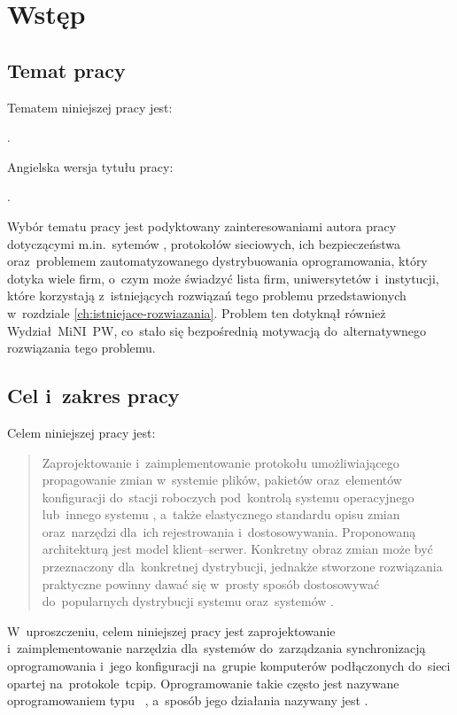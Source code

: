 \documentclass[thesis]{subfiles}
\makeatletter
\let\inserttitle\@title
\let\inserttitleaux\@titleaux
\makeatother
\begin{document}
\chapter{Wstęp}


\section{Temat pracy}

\noindent Tematem niniejszej pracy jest:
\begin{displayquote}
\inserttitle.
\end{displayquote}
Angielska wersja tytułu pracy:
\begin{displayquote}
\inserttitleaux.
\end{displayquote}
Wybór tematu pracy jest podyktowany zainteresowaniami autora pracy dotyczącymi m.in.~sytemów , protokołów sieciowych, ich bezpieczeństwa oraz~problemem zautomatyzowanego dystrybuowania oprogramowania, który dotyka wiele firm, o~czym może świadzyć lista firm, uniwersytetów i~instytucji, które korzystają z~istniejących rozwiązań tego problemu przedstawionych w~rozdziale \ref{ch:istniejace-rozwiazania}. Problem ten dotyknął również Wydział~MiNI~PW, co~stało się bezpośrednią motywacją do~alternatywnego rozwiązania tego problemu.


\section{Cel i~zakres pracy}
\label{sec:cel-i-zakres}

\noindent Celem niniejszej pracy jest:
\blockcquote{formularz-zgloszenia-pracy}{Zaprojektowanie i~zaimplementowanie protokołu umożliwiającego propagowanie zmian w~systemie plików, pakietów oraz~elementów konfiguracji do~stacji roboczych pod~kontrolą systemu operacyjnego  lub~innego systemu , a~także elastycznego standardu opisu zmian oraz~narzędzi dla~ich rejestrowania i~dostosowywania. Proponowaną architekturą jest model klient--serwer. Konkretny obraz zmian może być przeznaczony dla~konkretnej dystrybucji, jednakże stworzone rozwiązania praktyczne powinny dawać się w~prosty sposób dostosowywać do~popularnych dystrybucji systemu  oraz~systemów .}
W~uproszczeniu, celem niniejszej pracy jest zaprojektowanie i~zaimplementowanie narzędzia dla~systemów  do~zarządzania synchronizacją oprogramowania i~jego konfiguracji na~grupie komputerów podłączonych do~sieci opartej na~protokole~\gls{tcpip}. Oprogramowanie takie często jest nazywane oprogramowaniem typu ~\cite{wiki:scm}, a~sposób jego działania nazywany jest .
\end{document}
